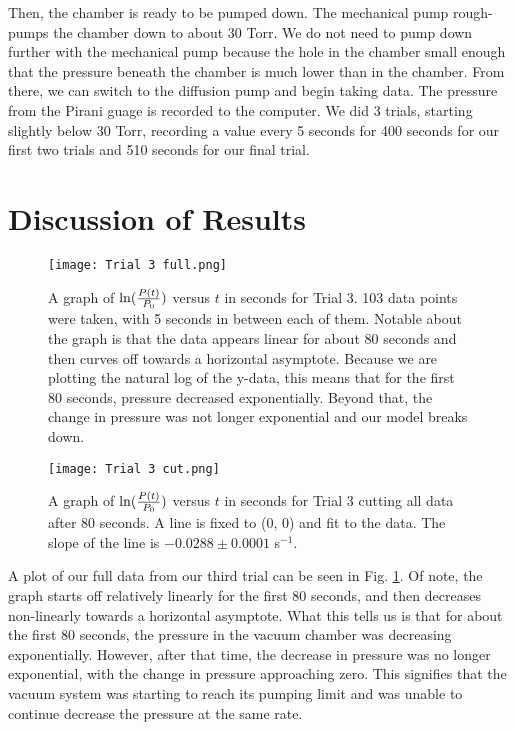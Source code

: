 \documentclass[11pt,letterpaper]{article}
\begin{document}
Then, the chamber is ready to be pumped down. The mechanical pump rough-pumps the chamber down to about 30 Torr. We do not need to pump down further with the mechanical pump because the hole in the chamber small enough that the pressure beneath the chamber is much lower than in the chamber. From there, we can switch to the diffusion pump and begin taking data. The pressure from the Pirani guage is recorded to the computer. We did 3 trials, starting slightly below 30 Torr, recording a value every 5 seconds for 400 seconds for our first two trials and 510 seconds for our final trial.



\section{Discussion of Results}

\begin{figure}
\centerline{\texttt{[image: Trial 3 full.png]}}
\caption{A graph of  $\ln({P(t) \over P_0})$ versus $t$ in seconds for Trial 3. 103 data points were taken, with 5 seconds in between each of them. Notable about the graph is that the data appears linear for about 80 seconds and then curves off towards a horizontal asymptote. Because we are plotting the natural log of the y-data, this means that for the first 80 seconds, pressure decreased exponentially. Beyond that, the change in pressure was not longer exponential and our model breaks down.} \label{Trial 3 full}
\end{figure}

\begin{figure}
\centerline{\texttt{[image: Trial 3 cut.png]}}
\caption{A graph of  $\ln({P(t) \over P_0})$ versus $t$ in seconds for Trial 3 cutting all data after 80 seconds. A line is fixed to (0, 0) and fit to the data. The slope of the line is $-0.0288 \pm 0.0001$ s$^{-1}$.} \label{Trial 3 cut}
\end{figure}

A plot of our full data from our third trial can be seen in Fig. \ref{Trial 3 full}. Of note, the graph starts off relatively linearly for the first 80 seconds, and then decreases non-linearly towards a horizontal asymptote. What this tells us is that for about the first 80 seconds, the pressure in the vacuum chamber was decreasing exponentially. However, after that time, the decrease in pressure was no longer exponential, with the change in pressure approaching zero. This signifies that the vacuum system was starting to reach its pumping limit and was unable to continue decrease the pressure at the same rate.
\end{document}
